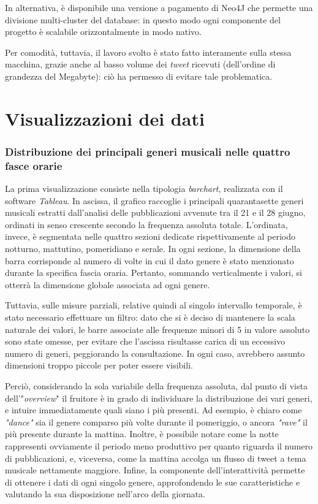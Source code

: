 \documentclass[12pt, a4paper, twocolumn]{article} %
\begin{document}
In alternativa, è disponibile una versione a pagamento di Neo4J\cite{neo4jEnterprise} che permette una divisione multi-cluster del database: in questo modo ogni componente del progetto è scalabile orizzontalmente in modo nativo.

Per comodità, tuttavia, il lavoro svolto è stato fatto interamente sulla stessa macchina, grazie anche al basso volume dei \textit{tweet} ricevuti (dell'ordine di grandezza del Megabyte): ciò ha permesso di evitare tale problematica.

\hfill
\newpage
\part{Visualizzazioni dei dati}
\section{Distribuzione dei principali generi musicali nelle quattro fasce orarie}
La prima visualizzazione consiste nella tipologia \textit{barchart}, realizzata con il software \textit{Tableau}.
In ascissa, il grafico raccoglie i principali quarantasette generi musicali estratti dall'analisi delle pubblicazioni avvenute tra il 21 e il 28 giugno, ordinati in senso crescente secondo la frequenza assoluta totale. 
L'ordinata, invece, è segmentata nelle quattro sezioni dedicate rispettivamente al periodo notturno, mattutino, pomeridiano e serale. 
In ogni sezione, la dimensione della barra corrisponde al numero di volte in cui il dato genere è stato menzionato durante la specifica fascia oraria.
Pertanto, sommando verticalmente i valori, si otterrà la dimensione globale associata ad ogni genere.

Tuttavia, sulle misure parziali, relative quindi al singolo intervallo temporale, è stato necessario effettuare un filtro: dato che si è deciso di mantenere la scala naturale dei valori, le barre associate alle frequenze minori di 5 in valore assoluto sono state omesse, per evitare che l'ascissa risultasse carica di un eccessivo numero di generi, peggiorando la consultazione.
In ogni caso, avrebbero assunto dimensioni troppo piccole per poter essere visibili.

Perciò, considerando la sola variabile della frequenza assoluta, dal punto di vista dell'"\textit{overview}" il fruitore è in grado di individuare la distribuzione dei vari generi, e intuire immediatamente quali siano i più presenti. 
Ad esempio, è chiaro come \textit{"dance"} sia il genere comparso più volte durante il pomeriggio, o ancora \textit{"rave"} il più presente durante la mattina. 
Inoltre, è possibile notare come la notte rappresenti ovviamente il periodo meno produttivo per quanto riguarda il numero di pubblicazioni, e, viceversa, come la mattina accolga un flusso di tweet a tema musicale nettamente maggiore. 
Infine, la componente dell'interattività permette di ottenere i dati di ogni singolo genere, approfondendo le sue caratteristiche e valutando la sua disposizione nell'arco della giornata.
\end{document}

